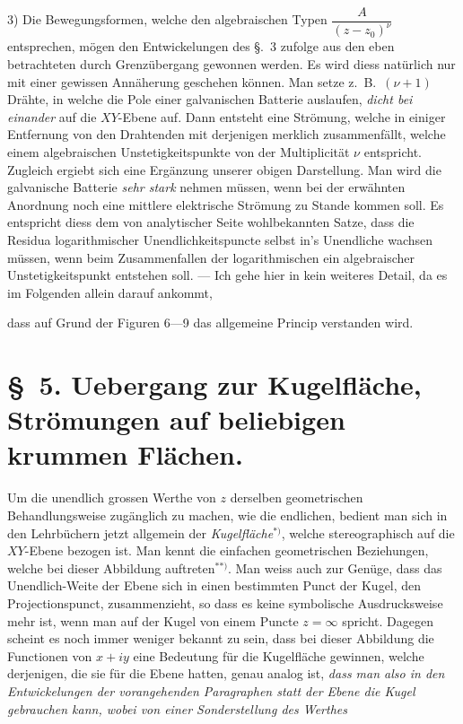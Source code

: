 \documentclass{article}
\begin{document}
3) Die Bewegungsformen, welche den algebraischen Typen $\dfrac{A}{(z - z_{0})^{\nu}}$ entsprechen, mögen den Entwickelungen des §.~3 zufolge aus den eben betrachteten durch Grenzübergang gewonnen werden. Es wird diess natürlich nur mit einer gewissen Annäherung geschehen können. Man setze z.\ B.\ $(\nu + 1)$ Drähte, in welche die Pole einer galvanischen Batterie auslaufen, \emph{dicht bei einander} auf die $XY$-Ebene auf. Dann entsteht eine Strömung, welche in einiger Entfernung von den Drahtenden mit derjenigen merklich zusammenfällt, welche einem algebraischen Unstetigkeitspunkte von der Multiplicität $\nu$ entspricht. Zugleich ergiebt sich eine Ergänzung unserer obigen Darstellung. Man wird die galvanische Batterie \emph{sehr stark} nehmen müssen, wenn bei der erwähnten Anordnung noch eine mittlere elektrische Strömung zu Stande kommen soll. Es entspricht diess dem von analytischer Seite wohlbekannten Satze, dass die Residua logarithmischer Unendlichkeitspuncte selbst in's Unendliche wachsen müssen, wenn beim Zusammenfallen der logarithmischen ein algebraischer Unstetigkeitspunkt entstehen soll. --- Ich gehe hier in kein weiteres Detail, da es im Folgenden allein darauf ankommt,

dass auf Grund der Figuren 6---9 das allgemeine Princip verstanden wird.

\section*{§~5. Uebergang zur Kugelfläche, Strömungen auf beliebigen krummen Flächen.}

Um die unendlich grossen Werthe von $z$ derselben geometrischen Behandlungsweise zugänglich zu machen, wie die endlichen, bedient man sich in den Lehrbüchern jetzt allgemein der \emph{Kugelfläche}${}^{*)}$, welche stereographisch auf die $XY$-Ebene bezogen ist. Man kennt die einfachen geometrischen Beziehungen, welche bei dieser Abbildung auftreten${}^{**)}$. Man weiss auch zur Genüge, dass das Unendlich-Weite der Ebene sich in einen bestimmten Punct der Kugel, den Projectionspunct, zusammenzieht, so dass es keine symbolische Ausdrucksweise mehr ist, wenn man auf der Kugel von einem Puncte $z = \infty$ spricht. Dagegen scheint es noch immer weniger bekannt zu sein, dass bei dieser Abbildung die Functionen von $x + iy$ eine Bedeutung für die Kugelfläche gewinnen, welche derjenigen, die sie für die Ebene hatten, genau analog ist, \emph{dass man also in den Entwickelungen der vorangehenden Paragraphen statt der Ebene die Kugel gebrauchen kann, wobei von einer Sonderstellung des Werthes}
\end{document}
